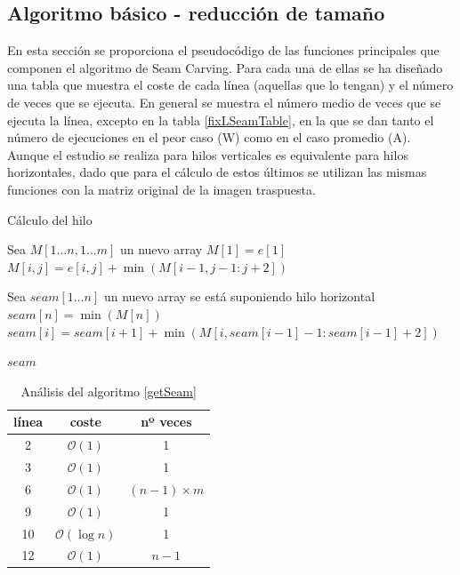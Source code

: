 \documentclass[12pt,a4paper,oneside]{article}
\let\oldReturn\Return
\renewcommand{\Return}{\State\oldReturn}
\begin{document}
\subsection{Algoritmo básico - reducción de tamaño}
En esta sección se proporciona el pseudocódigo de las funciones principales que componen
el algoritmo de Seam Carving. Para cada una de ellas se ha diseñado una tabla que muestra
el coste de cada línea (aquellas que lo tengan) y el número de veces que se ejecuta. En
general se muestra el número medio de veces que se ejecuta la línea, excepto en la tabla
\ref{fixLSeamTable}, en la que se dan tanto el número de ejecuciones en el peor caso (W)
como en el caso promedio (A). Aunque el estudio se realiza para hilos verticales es
equivalente para hilos horizontales, dado que para el cálculo de estos últimos se utilizan
las mismas funciones con la matriz original de la imagen traspuesta.

\begin{algorithm}
    \caption{Cálculo del hilo}\label{getSeam}
    \begin{algorithmic}[1]
        \State Sea $M[1 \ldots {n}, 1 \ldots m] $ un nuevo array
        \State $M[1] = e[1]$   
                \State $M[i, j] = e[i, j] + \min (M[i-1, j-1:j+2])$
            \EndFor
        \EndFor


        \State Sea $seam[1 \ldots n]$ un nuevo array \Comment se está suponiendo hilo horizontal
        \State $seam[n] = \min (M[n])$
            \State $seam[i] = seam[i+1] + \min (M[i, seam[i-1]-1:seam[i-1]+2])$
        \EndFor

        \Return $seam$
        \EndFunction
    \end{algorithmic}
\end{algorithm}

\begin{table}
    \label{getSeamTable}
    \center
    \begin{tabular}{|c|c|c|}
        \hline
        línea & coste & nº veces \\
        \hline
        2 & $\mathcal{O}(1)$ & 1 \\
        \hline
        3 & $\mathcal{O}(1)$ & 1 \\
        \hline
        6 & $\mathcal{O}(1)$ & $(n-1) \times m$ \\
        \hline
        9 & $\mathcal{O}(1)$ & 1 \\
        \hline
        10 & $\mathcal{O}(\log{}n)$ & 1 \\
        \hline
        12 & $\mathcal{O}(1)$ & $n-1$ \\
        \hline
    \end{tabular}
    \caption{Análisis del algoritmo \ref{getSeam}}
\end{table}
\end{document}
